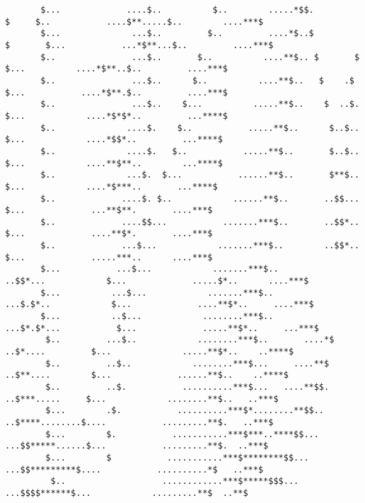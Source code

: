 \begin{verbatim}
       $...             ....$..          $..        .....*$$.            $     $..           ....$**.....$..        ....***$
       $...              ...$..         $..         ....*$..$          $       $...           ...*$**...$..         ....***$
       $..               ...$..       $..          ....**$.. $       $          $...          ....*$**..$..         ....***$
       $..               ...$..      $..          ....**$..   $    .$           $...           ....*$**.$..         ....***$
       $..               ...$..    $...          .....**$..    $  ..$.          $...            ....*$*$*..         ...****$
       $..              ....$.    $..           .....**$..      $..$..           $...            ....*$$*..         ...****$
       $..              ....$.   $..           .....**$..       $..$..           $...            ....**$**..        ...****$
       $..              ...$.  $...           ......**$..       $**$..            $...            ....*$***..       ...****$
       $..             ....$. $..            ......**$..       ..$$...            $...             ...**$**.       ....***$
       $..             ....$$...           .......***$..       ..$$*..            $...             ....**$*.       ....***$
       $..             ...$...            .......***$..        ..$$*..            $...             .....***..      ....***$
       $...           ...$...            .......***$..         ..$$*...            $...             .....$*..      ....***$
       $...          ...$...            .......***$..         ...$.$*..            $...             ....**$*..     ....***$
       $...          ..$...            ........***$..        ...$*.$*...           $...             .....**$*..     ...***$
        $..         ...$..            ........***$..       ....*$ ..$*....         $...              .....**$*..    ..****$
        $..         ..$..            ........***$...     ....**$   ..$**....        $...             ......**$..    ..****$
        $..         ..$.           ..........***$...   ....**$$.    ..$***.....     $...            ........**$..   ..***$
        $...        .$.           ..........***$*........**$$..      ..$****........$....           .........**$.   ..***$
        $...        $.           ...........***$***..****$$...       ...$$*****......$...           .........**$.  ..***$
        $...        $           ...........***$********$$...           ...$$*********$....           ..........*$   ..***$
         $..                   ............***$*****$$$...               ...$$$$******$...            .........**$  ..**$

\end{verbatim}
